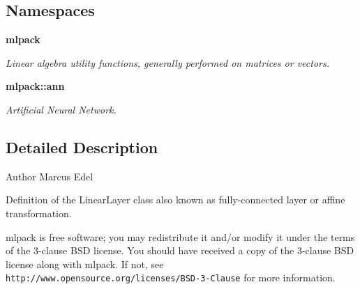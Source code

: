 \subsection*{Namespaces}
\begin{DoxyCompactItemize}
\item 
 {\bf mlpack}
\begin{DoxyCompactList}\small\item\em Linear algebra utility functions, generally performed on matrices or vectors. \end{DoxyCompactList}\item 
 {\bf mlpack\+::ann}
\begin{DoxyCompactList}\small\item\em Artificial Neural Network. \end{DoxyCompactList}\end{DoxyCompactItemize}


\subsection{Detailed Description}
\begin{DoxyAuthor}{Author}
Marcus Edel
\end{DoxyAuthor}
Definition of the Linear\+Layer class also known as fully-\/connected layer or affine transformation.

mlpack is free software; you may redistribute it and/or modify it under the terms of the 3-\/clause B\+SD license. You should have received a copy of the 3-\/clause B\+SD license along with mlpack. If not, see {\tt http\+://www.\+opensource.\+org/licenses/\+B\+S\+D-\/3-\/\+Clause} for more information. 